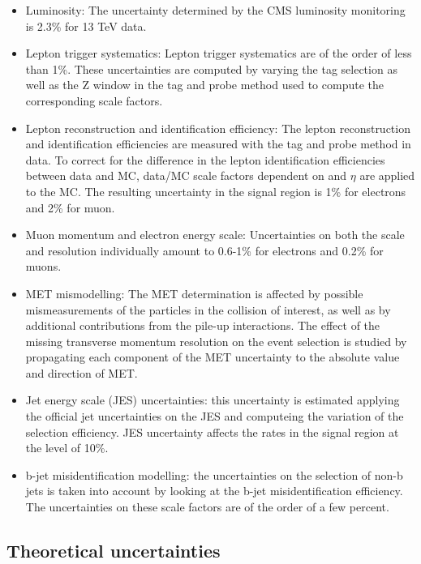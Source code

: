 \begin{itemize}
\item Luminosity: The uncertainty determined by the CMS luminosity monitoring is 2.3\% for 13 TeV data.
\item Lepton trigger systematics: Lepton trigger systematics are of the order of less than 1\%. 
These uncertainties are computed by varying the tag selection
as well as the Z window in the tag and probe method used to compute the corresponding scale factors.
\item Lepton reconstruction and identification efficiency:
The lepton reconstruction and identification efficiencies are measured with the tag
and probe method in data. To correct for the difference in the lepton identification
efficiencies between data and MC, data/MC scale factors dependent on \pt and $\eta$ are
applied to the MC. The resulting uncertainty in the signal region is  1\% for electrons
and 2\% for muon.
\item Muon momentum and electron energy scale:  Uncertainties on both the scale and resolution individually amount to  0.6-1\% for electrons 
and  0.2\% for muons. 

\item MET mismodelling: The MET determination is affected by possible mismeasurements of the particles in the collision of interest, 
as well as by additional contributions from the pile-up interactions. The effect of the missing transverse momentum resolution on the event selection is studied by propagating each component of the MET uncertainty to the absolute value and direction of MET.

\item Jet energy scale (JES) uncertainties: this uncertainty is estimated 
applying the official jet uncertainties on the JES  and computeing the variation of the selection efficiency. JES uncertainty affects the
rates in the signal region at the level of  10\%.

\item b-jet misidentification modelling: the uncertainties on the selection of non-b jets is taken into account by looking at
the b-jet misidentification efficiency. The uncertainties on these scale factors are of the
order of a few percent.
\end{itemize}





\subsection*{ Theoretical uncertainties}

